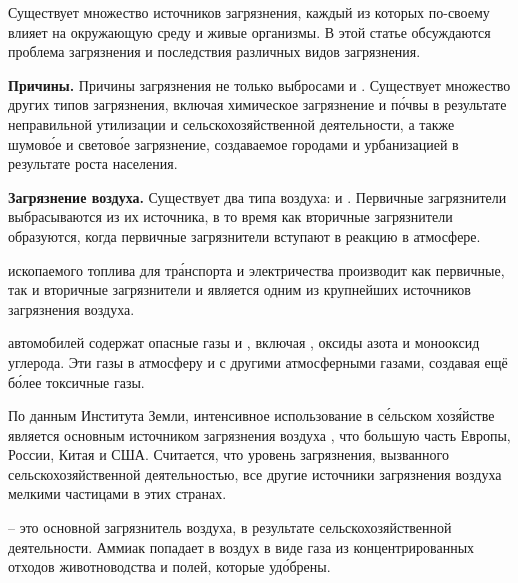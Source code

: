 Существует множество источников загрязнения, каждый из которых по-своему влияет на окружающую среду и живые организмы. В этой статье обсуждаются проблема загрязнения и последствия различных видов загрязнения.

\textbf{Причины.} Причины загрязнения не  только выбросами  и . Существует множество других типов загрязнения, включая химическое загрязнение  и п\'{о}чвы в результате неправильной утилизации и сельскохозяйственной деятельности, а также шумов\'{о}е и светов\'{о}е загрязнение, создаваемое городами и урбанизацией в результате роста населения.

\textbf{Загрязнение воздуха.}
Существует два типа  воздуха:  и . Первичные загрязнители выбрасываются  из их источника, в то время как вторичные загрязнители образуются, когда первичные загрязнители вступают в реакцию в атмосфере.

 ископаемого топлива для тр\'{а}нспорта и электричества производит как первичные, так и вторичные загрязнители и является одним из крупнейших источников загрязнения воздуха.

 автомобилей содержат опасные газы и , включая , оксиды азота и монооксид углерода. Эти газы  в атмосферу и  с другими атмосферными газами, создавая ещё б\'{о}лее токсичные газы.

По данным Института Земли, интенсивное использование  в с\'{е}льском хоз\'{я}йстве является основным источником загрязнения воздуха , что  большую часть Европы, России, Китая и США. Считается, что уровень загрязнения, вызванного сельскохозяйственной деятельностью,  все другие источники загрязнения воздуха мелкими частицами в этих странах.

 -- это основной загрязнитель воздуха,  в результате сельскохозяйственной деятельности. Аммиак попадает в воздух в виде газа из концентрированных отходов животноводства и полей, которые  уд\'{о}брены.


